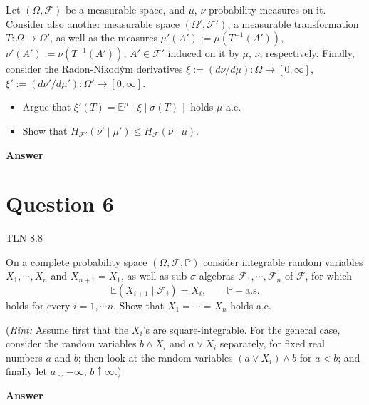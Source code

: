 \documentclass[letterpaper]{article}
\begin{document}
		Let $(\Omega, \mathcal{F})$ be a measurable space, and $\mu$, $\nu$ probability measures on it. Consider also another measurable space $(\Omega', \mathcal{F}')$, a measurable transformation $T : \Omega \to \Omega'$, as well as the measures $\mu'(A') := \mu(T^{-1}(A'))$, $\nu'(A') := \nu(T^{-1}(A'))$, $A' \in \mathcal{F}'$ induced on it by $\mu$, $\nu$, respectively. Finally, consider the Radon-Nikod\'{y}m derivatives $\xi := (d\nu/d\mu) : \Omega \to [0,\infty]$, $\xi' := (d\nu'/d\mu') : \Omega' \to [0,\infty]$.
		\begin{itemize}
			\item[(i)] Argue that $\xi'(T) = \mathbb{E}^{\mu}[\,\xi \mid \sigma(T)\,]$ holds $\mu$-a.e.
			\item[(ii)] Show that $H_{\mathcal{F}'}(\nu' \mid \mu') \leq H_{\mathcal{F}}(\nu \mid \mu)$.
		\end{itemize}
		
		\textbf{Answer}
		
		\clearpage
		
		\section{Question 6}
		
		{\color{deepred} TLN 8.8}
		
		On a complete probability space $(\Omega, \mathcal{F}, \mathbb{P})$ consider integrable random variables $X_1, \cdots, X_n$ and $X_{n+1} = X_1$, as well as sub-$\sigma$-algebras $\mathcal{F}_1, \cdots, \mathcal{F}_n$ of $\mathcal{F}$, for which
		\[
		\mathbb{E}(X_{i+1} \mid \mathcal{F}_i) = X_i, \qquad \mathbb{P}-\text{a.s.}
		\]
		holds for every $i = 1, \cdots n$. Show that $X_1 = \cdots = X_n$ holds a.e.
		
		(\textit{Hint:} Assume first that the $X_i$'s are square-integrable. For the general case, consider the random variables $b \wedge X_i$ and $a \vee X_i$ separately, for fixed real numbers $a$ and $b$; then look at the random variables $(a \vee X_i) \wedge b$ for $a < b$; and finally let $a \downarrow -\infty$, $b \uparrow \infty$.)
		
		\textbf{Answer}
		
		
	
\end{document}
